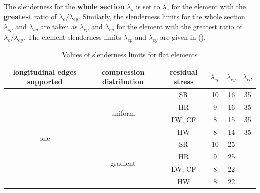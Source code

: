 The slenderness for the \textbf{whole section} $\lambda_s$ is set to $\lambda_e$ for the element with the \textbf{greatest} ratio of $\lambda_e/\lambda_{ey}$.
Similarly, the slenderness limits for the whole section $\lambda_{sp}$ and $\lambda_{sy}$ are taken as $\lambda_{ep}$ and $\lambda_{ey}$ for the element with the greatest ratio of $\lambda_e/\lambda_{ey}$.
The element slenderness limits $\lambda_{ep}$ and $\lambda_{ey}$ are given in  ().
\begin{table}[htbp]
\centering\footnotesize
\caption{Values of slenderness limits for flat elements}\label{tab:yield_limit}
\begin{tabular}{ccc|ccc}
	\toprule
	\parbox{2.5cm}{\centering{}longitudinal edges supported} & \parbox{2cm}{\centering{}compression distribution} &  residual stress   & $\lambda_{ep}$ & $\lambda_{ey}$ & $\lambda_{ed}$ \\ \midrule
	                {*}{one}                  &            {*}{uniform}             &         SR         &       10       &       16       &       35       \\
	                                                         &                                                    &         HR         &       9        &       16       &       35       \\
	                                                         &                                                    &       LW, CF       &       8        &       15       &       35       \\
	                                                         &                                                    &         HW         &       8        &       14       &       35       \\
	                                           &            {*}{gradient}            &         SR         &       10       &       25       &                \\
	                                                         &                                                    &         HR         &       9        &       25       &                \\
	                                                         &                                                    &       LW, CF       &       8        &       22       &                \\
	                                                         &                                                    &         HW         &       8        &       22       &                \\ \midrule

\end{tabular}
\end{table}
